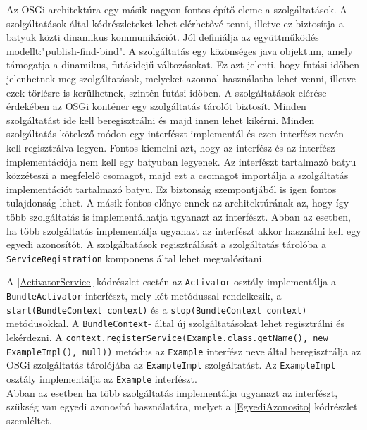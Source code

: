 Az OSGi architektúra egy másik nagyon fontos építő eleme a szolgáltatások. A szolgáltatások által kódrészleteket lehet elérhetővé tenni, illetve ez biztosítja a batyuk közti dinamikus kommunikációt. Jól definiálja az együttműködés modellt:"publish-find-bind". A szolgáltatás egy közönséges java objektum, amely támogatja a dinamikus, futásidejű változásokat. Ez azt jelenti, hogy futási időben jelenhetnek meg szolgáltatások, melyeket azonnal használatba lehet venni, illetve ezek törlésre is kerülhetnek, szintén futási időben. A szolgáltatások elérése érdekében az OSGi konténer egy szolgáltatás tárolót biztosít. Minden szolgáltatást ide kell beregisztrálni és majd innen lehet kikérni. Minden szolgáltatás kötelező módon egy interfészt implementál és ezen interfész nevén kell regisztrálva legyen. Fontos kiemelni azt, hogy az interfész és az interfész implementációja nem kell egy batyuban legyenek. Az interfészt tartalmazó batyu közzéteszi a megfelelő csomagot, majd ezt a csomagot importálja a szolgáltatás implementációt tartalmazó batyu. Ez biztonság szempontjából is igen fontos tulajdonság lehet. A másik fontos előnye ennek az architektúrának az, hogy így több szolgáltatás is implementálhatja ugyanazt az interfészt. Abban az esetben, ha több szolgáltatás implementálja ugyanazt az interfészt akkor használni kell egy egyedi azonosítót. A szolgáltatások regisztrálását a szolgáltatás tárolóba a \texttt{ServiceRegistration} komponens által lehet megvalósítani.

%



A \ref{ActivatorService} kódrészlet esetén az \texttt{Activator} osztály implementálja a \texttt{BundleActivator} interfészt, mely két metódussal rendelkezik, a \texttt{start(BundleContext context)} és a \texttt{stop(BundleContext context)} metódusokkal. A \texttt{BundleContext}- által új szolgáltatásokat lehet regisztrálni és lekérdezni. A \texttt{context.registerService(Example.class.getName(), new ExampleImpl(), null))} metódus az \texttt{Example} interfész neve által beregisztrálja az OSGi szolgáltatás tárolójába az \texttt{ExampleImpl} szolgáltatást. Az \texttt{ExampleImpl} osztály implementálja az \texttt{Example} interfészt.
\\Abban az esetben ha több szolgáltatás implementálja ugyanazt az interfészt, szükség van egyedi azonosító használatára, melyet a \ref{EgyediAzonosito} kódrészlet szemléltet.

